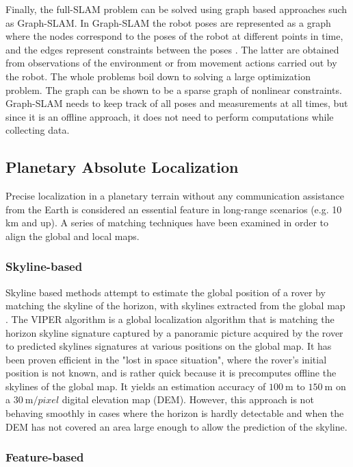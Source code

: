 Finally, the full-SLAM problem can be solved using graph based approaches
such as Graph-SLAM.
In Graph-SLAM the robot poses are represented as a graph where the
nodes correspond to the poses of the robot at different points in time,
and the edges represent constraints between the poses \parencite{Thrun2005}.
The latter are obtained from observations of the environment or from
movement actions carried out by the robot.
The whole problems boil down to solving a large optimization problem.
The graph can be shown to be a sparse graph of nonlinear constraints.
Graph-SLAM needs to keep track of all poses and measurements at all times,
but since it is an offline approach, it does not need to perform computations
while collecting data.

\subsection{Planetary Absolute Localization}

Precise localization in a planetary terrain without any communication
assistance from the Earth is considered an essential feature in
long-range scenarios (e.g. 10 km and up).
A series of matching techniques have been examined in order to align the
global and local maps.

\subsubsection{Skyline-based}

Skyline based methods attempt to estimate the global position of a rover
by matching the skyline of the horizon, with skylines extracted from
the global map \parencite{Stein1992, Cozman1997}.
The VIPER algorithm \parencite{Cozman2000} is a global localization
algorithm that is matching the horizon skyline signature captured by a
panoramic picture acquired by the rover to predicted skylines signatures
at various positions on the global map.
It has been proven efficient in the "lost in space situation",
where the rover's initial position is not known, and is rather quick because
it is precomputes offline the skylines of the global map.
It yields an estimation accuracy of $\SI{100}{\m}$ to $\SI{150}{\m}$ on a
$\SI{30}{\m \per pixel}$ digital elevation map (DEM).
However, this approach is not behaving smoothly in cases where the horizon
is hardly detectable and when the DEM has not covered an area large enough
to allow the prediction of the skyline.

\subsubsection{Feature-based}

